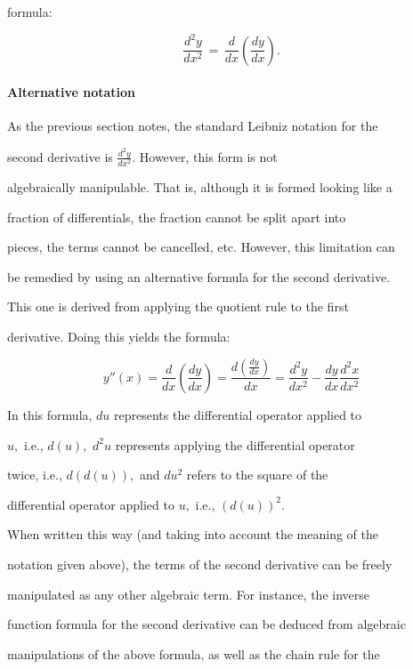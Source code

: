 formula:



$$\frac{d^2y}{dx^2} \,=\, \frac{d}{dx}\left(\frac{dy}{dx}\right).$$



\paragraph{Alternative notation}



As the previous section notes, the standard Leibniz notation for the

second derivative is $\frac{d^2y}{dx^2}.$ However, this form is not

algebraically manipulable. That is, although it is formed looking like a

fraction of differentials, the fraction cannot be split apart into

pieces, the terms cannot be cancelled, etc. However, this limitation can

be remedied by using an alternative formula for the second derivative.

This one is derived from applying the quotient rule to the first

derivative. Doing this yields the formula:



$$y''(x) = \frac{d}{dx}\left(\frac{dy}{dx}\right) = \frac{d\left(\frac{dy}{dx}\right)}{dx} = \frac{d^2y}{dx^2} - \frac{dy}{dx}\frac{d^2x}{dx^2}$$



In this formula, $du$ represents the differential operator applied to

$u,$ i.e., $d(u),$ $d^2u$ represents applying the differential operator

twice, i.e., $d(d(u)),$ and $du^2$ refers to the square of the

differential operator applied to $u,$ i.e., $(d(u))^2.$



When written this way (and taking into account the meaning of the

notation given above), the terms of the second derivative can be freely

manipulated as any other algebraic term. For instance, the inverse

function formula for the second derivative can be deduced from algebraic

manipulations of the above formula, as well as the chain rule for the

